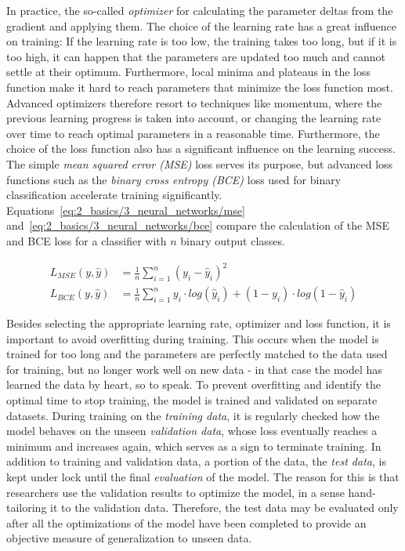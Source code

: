 In practice, the so-called \emph{optimizer} for calculating the parameter deltas from the gradient and applying them. The choice of the learning rate has a great influence on training: If the learning rate is too low, the training takes too long, but if it is too high, it can happen that the parameters are updated too much and cannot settle at their optimum. Furthermore, local minima and plateaus in the loss function make it hard to reach parameters that minimize the loss function most. Advanced optimizers therefore resort to techniques like momentum, where the previous learning progress is taken into account, or changing the learning rate over time to reach optimal parameters in a reasonable time. Furthermore, the choice of the loss function also has a significant influence on the learning success. The simple \emph{mean squared error (MSE)} loss serves its purpose, but advanced loss functions such as the \emph{binary cross entropy (BCE)} loss used for binary classification accelerate training significantly. Equations~\ref{eq:2_basics/3_neural_networks/mse} and~\ref{eq:2_basics/3_neural_networks/bce} compare the calculation of the MSE and BCE loss for a classifier with $n$ binary output classes.

\begin{align}
    L_{MSE}(y, \hat{y}) &= \frac{1}{n} \sum_{i=1}^n (y_i - \hat{y}_i)^2
    \label{eq:2_basics/3_neural_networks/mse} \\
    L_{BCE}(y, \hat{y}) &= \frac{1}{n} \sum_{i=1}^n y_i \cdot log( \hat{y}_i) + (1-y_i) \cdot log(1 - \hat{y}_i)
    \label{eq:2_basics/3_neural_networks/bce}
\end{align}

Besides selecting the appropriate learning rate, optimizer and loss function, it is important to avoid overfitting during training. This occurs when the model is trained for too long and the parameters are perfectly matched to the data used for training, but no longer work well on new data - in that case the model has learned the data by heart, so to speak. To prevent overfitting and identify the optimal time to stop training, the model is trained and validated on separate datasets. During training on the \emph{training data}, it is regularly checked how the model behaves on the unseen \emph{validation data}, whose loss eventually reaches a minimum and increases again, which serves as a sign to terminate training. In addition to training and validation data, a portion of the data, the \emph{test data}, is kept under lock until the final \emph{evaluation} of the model. The reason for this is that researchers use the validation results to optimize the model, in a sense hand-tailoring it to the validation data. Therefore, the test data may be evaluated only after all the optimizations of the model have been completed to provide an objective measure of generalization to unseen data.

